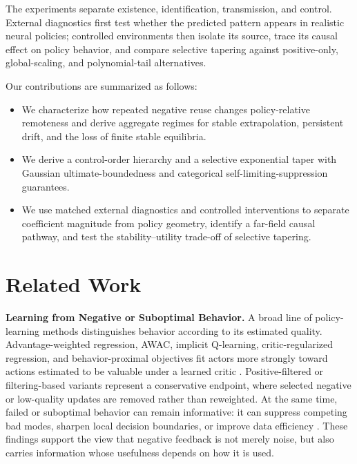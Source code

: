 \documentclass{article}
\theoremstyle{plain}
\theoremstyle{definition}
\theoremstyle{remark}
\begin{document}
The experiments separate existence, identification, transmission, and control.
External diagnostics first test whether the predicted pattern appears in
realistic neural policies; controlled environments then isolate its source,
trace its causal effect on policy behavior, and compare selective tapering
against positive-only, global-scaling, and polynomial-tail alternatives.

Our contributions are summarized as follows:
\begin{itemize}
    \item We characterize how repeated negative reuse changes
    policy-relative remoteness and derive aggregate regimes for stable
    extrapolation, persistent drift, and the loss of finite stable
    equilibria.

    \item We derive a control-order hierarchy and a selective exponential
    taper with Gaussian ultimate-boundedness and categorical
    self-limiting-suppression guarantees.

    \item We use matched external diagnostics and controlled interventions
    to separate coefficient magnitude from policy geometry, identify a
    far-field causal pathway, and test the stability--utility trade-off of
    selective tapering.
\end{itemize}


\section{Related Work}
\label{sec:related_work}

\textbf{Learning from Negative or Suboptimal Behavior.}
A broad line of policy-learning methods distinguishes behavior according
to its estimated quality. Advantage-weighted regression, AWAC, implicit
Q-learning, critic-regularized regression, and behavior-proximal
objectives fit actors more strongly toward actions estimated to be
valuable under a learned critic
\citep{peng2019advantage,nair2020awac,kostrikov2021offline,
wang2020critic,zhuang2023behavior}. Positive-filtered or filtering-based
variants represent a conservative endpoint, where selected negative or
low-quality updates are removed rather than reweighted. At the same
time, failed or suboptimal behavior can remain informative: it can
suppress competing bad modes, sharpen local decision boundaries, or
improve data efficiency
\citep{novati2019remember,fakoor2020p3o,arnal2025asymmetric}. These
findings support the view that negative feedback is not merely noise, but
also carries information whose usefulness depends on how it is used.
\end{document}
